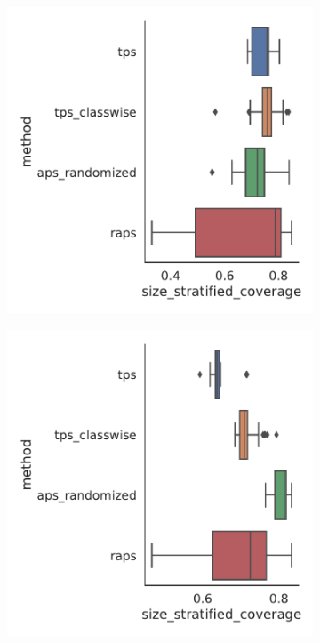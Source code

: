 \begin{figure}
    \begin{subfigure}{0.48\linewidth}
        \includegraphics[width=\linewidth,alt={Box plots for method comparison on Amazon Photos dataset size stratified coverage with 10 samples per class.}]{graphConformal/figures/nspc/amazon_photos_10_size_stratified_coverage.pdf}
    \end{subfigure}
    \begin{subfigure}{0.48\linewidth}
        \includegraphics[width=\linewidth,alt={Box plots for method comparison on Amazon Photos dataset size stratified coverage with 40 samples per class.}]{graphConformal/figures/nspc/amazon_photos_40_size_stratified_coverage.pdf}

\end{subfigure}
\end{figure}
